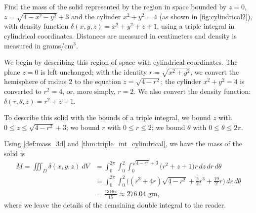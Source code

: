 {Find the mass of the solid represented by the region in space bounded by $z=0$, $z=\sqrt{4-x^2-y^2}+3$ and the cylinder $x^2+y^2=4$ (as shown in \autoref{fig:cylindrical2}), with density function $\delta(x,y,z) = x^2+y^2+z+1$, using a triple integral in cylindrical coordinates. Distances are measured in centimeters and density is measured in grams/cm$^3$.}
{We begin by describing this region of space with cylindrical coordinates. The plane $z=0$ is left unchanged; with the identity $r=\sqrt{x^2+y^2}$, we convert the hemisphere of radius 2 to the equation $z=\sqrt{4-r^2}$; the cylinder $x^2+y^2=4$ is converted to $r^2=4$, or, more simply, $r=2$.  We also convert the density function: $\delta(r,\theta,z) = r^2+z+1$.
%

To describe this solid with the bounds of a triple integral, we bound $z$ with $0\leq z\leq \sqrt{4-r^2}+3$; we bound $r$ with $0 \leq r \leq 2$; we bound $\theta$ with $0 \leq \theta \leq 2\pi$.

Using \autoref{def:mass_3d} and \autoref{thm:triple_int_cylindrical}, we have the mass of the solid is
\begin{align*}
M=\iiint_D\delta(x,y,z)\ dV &= \int_0^{2\pi}\int_0^2\int_0^{\sqrt{4-r^2}+3}\big(r^2+z+1\big)r\,dz\,dr\,d\theta \\
&= \int_0^{2\pi}\int_0^2\big((r^3+4r)\sqrt{4-r^2}+\frac52r^3+\frac{19}2r\big)\,dr\,d\theta \\
&= \frac{1318\pi}{15} \approx 276.04\text{ gm},
\end{align*}
where we leave the details of the remaining double integral to the reader.}

